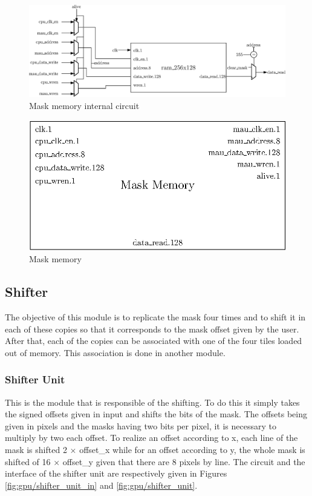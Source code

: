 \begin{figure}[H]
    \centering
    \includegraphics[width=\linewidth]{Chapter4-GPU_CLKU/res/mask_memory_in}
    \caption{Mask memory internal circuit}
    \label{fig:gpu/mask_memory_in}
\end{figure}

\begin{figure}[H]
    \centering
    \includegraphics[scale=0.8]{Chapter4-GPU_CLKU/res/mask_memory}
    \caption{Mask memory}
    \label{fig:gpu/mask_memory}
\end{figure}

\subsection{Shifter}

The objective of this module is to replicate the mask four times and to shift it in each of these 
copies so that it corresponds to the mask offset given by the user. After that, each of the copies 
can be associated with one of the four tiles loaded out of memory. This association is done in 
another module.

\subsubsection*{Shifter Unit}

This is the module that is responsible of the shifting. To do this it simply takes the signed 
offsets given in input and shifts the bits of the mask. The offsets being given in pixels and the
masks having two bits per pixel, it is necessary to multiply by two each offset. To realize an 
offset according to x, each line of the mask is shifted 2 $\times$ offset\_x while for an offset 
according to y, the whole mask is shifted of 16 $\times$ offset\_y given that there are 8 pixels 
by line. The circuit and the interface of the shifter unit are respectively given in Figures
\ref{fig:gpu/shifter_unit_in} and \ref{fig:gpu/shifter_unit}.

